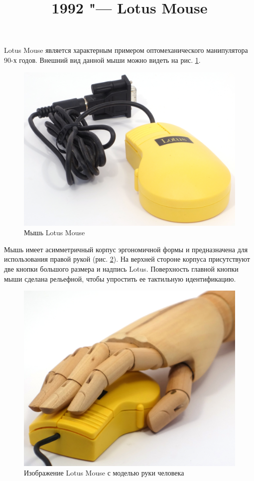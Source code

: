 \documentclass[11pt, a4paper]{article}
\begin{document}
\title{1992 "--- Lotus Mouse}
\date{}
\maketitle
{}
Lotus Mouse является характерным примером оптомеханического манипулятора 90-х годов. Внешний вид данной мыши можно видеть на рис. \ref{fig:LotusPic}.

\begin{figure}[h]
    \centering
    \includegraphics[scale=0.6]{1992_lotus_mouse/pic_30.jpg}
    \caption{Мышь Lotus Mouse}
    \label{fig:LotusPic}
\end{figure}

Мышь имеет асимметричный корпус эргономичной формы и предназначена для использования правой рукой (рис. \ref{fig:LotusHand}). На верхней стороне корпуса присутствуют две кнопки большого размера и надпись Lotus. Поверхность главной кнопки мыши сделана рельефной, чтобы упростить ее тактильную идентификацию.

\begin{figure}[h]
    \centering
    \includegraphics[scale=0.3]{1992_lotus_mouse/hand_30.jpg}
    \caption{Изображение Lotus Mouse с моделью руки человека}
    \label{fig:LotusHand}
\end{figure}
\end{document}

